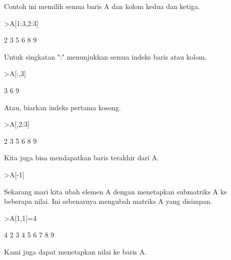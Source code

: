 \documentclass{article}
\begin{document}
\begin{eulernotebook}
\begin{eulercomment}
\begin{eulercomment}
\begin{eulercomment}
\begin{eulercomment}
\begin{eulercomment}
Contoh ini memilih semua baris A dan kolom kedua dan ketiga.
\end{eulercomment}
\begin{eulerprompt}
>A[1:3,2:3]
\end{eulerprompt}
\begin{euleroutput}
              2             3 
              5             6 
              8             9 
\end{euleroutput}
\begin{eulercomment}
Untuk singkatan ":" menunjukkan semua indeks baris atau kolom.
\end{eulercomment}
\begin{eulerprompt}
>A[:,3]
\end{eulerprompt}
\begin{euleroutput}
              3 
              6 
              9 
\end{euleroutput}
\begin{eulercomment}
Atau, biarkan indeks pertama kosong.
\end{eulercomment}
\begin{eulerprompt}
>A[,2:3]
\end{eulerprompt}
\begin{euleroutput}
              2             3 
              5             6 
              8             9 
\end{euleroutput}
\begin{eulercomment}
Kita juga bisa mendapatkan baris terakhir dari A.
\end{eulercomment}
\begin{eulerprompt}
>A[-1]
\end{eulerprompt}
\begin{euleroutput}
  [7,  8,  9]
\end{euleroutput}
\begin{eulercomment}
Sekarang mari kita ubah elemen A dengan menetapkan submatriks A ke
beberapa nilai. Ini sebenarnya mengubah matriks A yang disimpan.
\end{eulercomment}
\begin{eulerprompt}
>A[1,1]=4
\end{eulerprompt}
\begin{euleroutput}
              4             2             3 
              4             5             6 
              7             8             9 
\end{euleroutput}
\begin{eulercomment}
Kami juga dapat menetapkan nilai ke baris A.

\end{eulercomment}
\end{eulercomment}
\end{eulercomment}
\end{eulercomment}
\end{eulercomment}
\end{eulernotebook}
\end{document}
